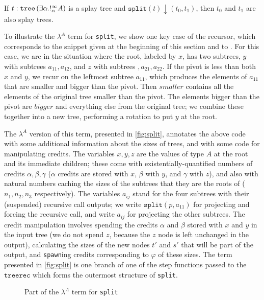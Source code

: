 \begin{lemma} \label{lem:splay-tree-invariant}
If $t : \texttt{tree}\left(\exists \alpha. !^\infty_\alpha A\right)$ is a splay tree and $\texttt{split}(t) \downarrow (t_0,t_1)$, then $t_0$ and $t_1$ are also splay trees.
\end{lemma}

To illustrate the $\lambda^A$ term for \texttt{split}, we show one key
case of the recursor, which corresponds to the snippet given at the
beginning of this section and to \cite[Theorem
  5.2]{okasaki:purely-functional-data-structures}.  For this case, we
are in the situation where the root, labeled by $x$, has two subtrees,
$y$ with subtrees $a_{11},a_{12}$, and $z$ with subtrees
$,a_{21},a_{22}$. If the pivot is less than both $x$ and $y$, we recur
on the leftmost subtree $a_{11}$, which produces the elements of
$a_{11}$ that are smaller and bigger than the pivot.  Then $smaller$
contains all the elements of the original tree smaller than the pivot.
The elements bigger than the pivot are $bigger$ and everything else from
the original tree; we combine these together into a new tree, performing
a rotation to put $y$ at the root.

The $\lambda^A$ version of this term, presented in \autoref{fig:split}, annotates the above code with some additional information about the sizes of trees, and with some code for manipulating credits.  The variables $x,y,z$ are the values of type $A$ at the root and its immediate children; these come with existentially-quantified numbers of credits $\alpha,\beta,\gamma$ ($\alpha$ credits are stored with $x$, $\beta$ with $y$, and $\gamma$ with $z$), and also with natural numbers caching the sizes of the subtrees that they are the roots of ($n_1,n_2,n_3$ respectively).
The variables $a_{ij}$ stand for the four subtrees with their (suspended) recursive call outputs; we write $\texttt{split}(p,a_{11})$ for projecting and forcing the recursive call, and write $a_{ij}$ for projecting the other subtrees.  The credit manipulation involves spending the credits $\alpha$ and $\beta$ stored with $x$ and $y$ in the input tree (we do not spend $z$, because the $z$ node is left unchanged in the output), calculating the sizes of the new nodes $t'$ and $s'$ that will be part of the output, and \texttt{spawn}ing credits corresponding to $\varphi$ of these sizes. The term presented in \autoref{fig:split} is one branch of one of the step functions passed to the $\texttt{treerec}$ which forms the outermost structure of \texttt{split}.

\begin{figure}
  \vspace{-0.1in}
  
  \vspace{-0.3in}
  \caption{Part of the $\lambda^A$ term for \texttt{split}}
    \vspace{-0.1in}
  \label{fig:split}
\end{figure}

